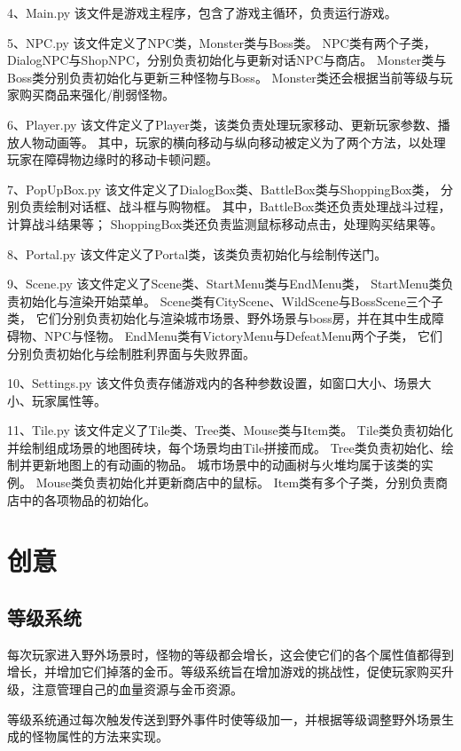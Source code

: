 \documentclass{ctexart}
\begin{document}
    4、Main.py
      该文件是游戏主程序，包含了游戏主循环，负责运行游戏。

    5、NPC.py
      该文件定义了NPC类，Monster类与Boss类。
      NPC类有两个子类，DialogNPC与ShopNPC，分别负责初始化与更新对话NPC与商店。
      Monster类与Boss类分别负责初始化与更新三种怪物与Boss。
      Monster类还会根据当前等级与玩家购买商品来强化/削弱怪物。

    6、Player.py
      该文件定义了Player类，该类负责处理玩家移动、更新玩家参数、播放人物动画等。
      其中，玩家的横向移动与纵向移动被定义为了两个方法，以处理玩家在障碍物边缘时的移动卡顿问题。

    7、PopUpBox.py
      该文件定义了DialogBox类、BattleBox类与ShoppingBox类，
      分别负责绘制对话框、战斗框与购物框。
      其中，BattleBox类还负责处理战斗过程，计算战斗结果等；
      ShoppingBox类还负责监测鼠标移动点击，处理购买结果等。

    8、Portal.py
      该文件定义了Portal类，该类负责初始化与绘制传送门。

    9、Scene.py
      该文件定义了Scene类、StartMenu类与EndMenu类，
      StartMenu类负责初始化与渲染开始菜单。
      Scene类有CityScene、WildScene与BossScene三个子类，
      它们分别负责初始化与渲染城市场景、野外场景与boss房，并在其中生成障碍物、NPC与怪物。
      EndMenu类有VictoryMenu与DefeatMenu两个子类，
      它们分别负责初始化与绘制胜利界面与失败界面。

    10、Settings.py
      该文件负责存储游戏内的各种参数设置，如窗口大小、场景大小、玩家属性等。

    11、Tile.py
      该文件定义了Tile类、Tree类、Mouse类与Item类。
      Tile类负责初始化并绘制组成场景的地图砖块，每个场景均由Tile拼接而成。
      Tree类负责初始化、绘制并更新地图上的有动画的物品。
      城市场景中的动画树与火堆均属于该类的实例。
      Mouse类负责初始化并更新商店中的鼠标。
      Item类有多个子类，分别负责商店中的各项物品的初始化。

\section{创意}
\subsection{等级系统}
每次玩家进入野外场景时，怪物的等级都会增长，这会使它们的各个属性值都得到增长，并增加它们掉落的金币。等级系统旨在增加游戏的挑战性，促使玩家购买升级，注意管理自己的血量资源与金币资源。

等级系统通过每次触发传送到野外事件时使等级加一，并根据等级调整野外场景生成的怪物属性的方法来实现。
\end{document}
